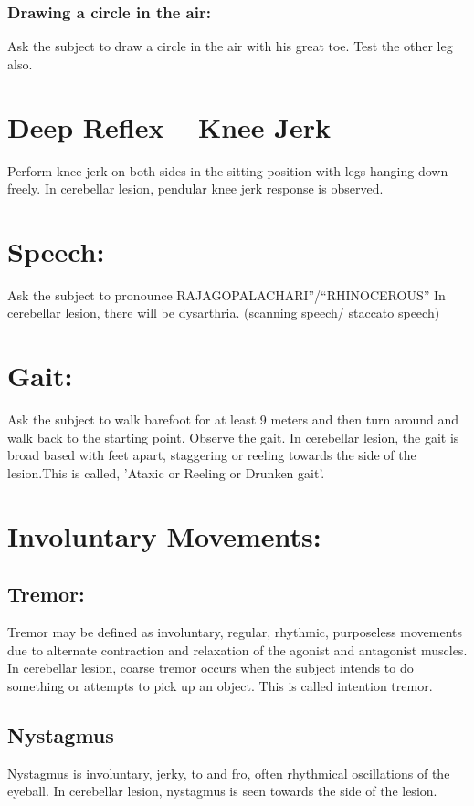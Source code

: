 \documentclass[a4paper,12pt,openany,oneside]{book}
\begin{document}
\subsubsection*{Drawing a circle in the air:}
				Ask the subject to draw a circle in the air with his great toe. Test the other leg  also.
				\section*{Deep Reflex – Knee Jerk}
					Perform knee jerk on both sides in the sitting position with legs hanging down freely.
						In cerebellar lesion, pendular knee jerk response is observed.

						\section*{Speech:}
						Ask the subject to pronounce RAJAGOPALACHARI”/“RHINOCEROUS”
							In cerebellar lesion, there will be dysarthria. (scanning speech/ staccato speech)
							\section*{Gait:}
								Ask the subject to walk barefoot for at least 9 meters and then turn around and walk back to the starting point. Observe the gait.
									In cerebellar lesion, the gait is broad based with feet apart, staggering or reeling towards the side of the lesion.This is called, 'Ataxic or Reeling or Drunken gait'.
								\section*{Involuntary Movements:} 
								\subsection*{Tremor:}
										Tremor may be defined as involuntary, regular, rhythmic, purposeless movements due to alternate contraction and relaxation of the agonist and antagonist muscles.
											In cerebellar lesion, coarse tremor occurs when the subject intends to do something or attempts to pick up an object. This is called intention tremor.
											\subsection*{Nystagmus}
											Nystagmus is involuntary, jerky, to and fro, often rhythmical oscillations of the eyeball. In cerebellar lesion, nystagmus is seen towards the side of the lesion.
\end{document}
